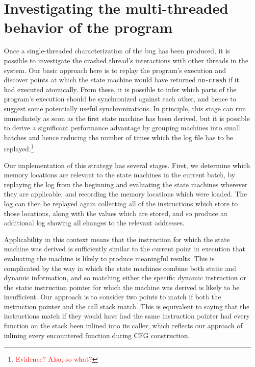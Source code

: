 \documentclass[10pt,twocolumn,preprint,natbib,authoryear]{sigplanconf}
\newcommand{\editorial}[1]{\textcolor{red}{\footnote{\textcolor{red}{#1}}}}
\begin{document}
\section{Investigating the multi-threaded behavior of the program}
\label{sect:multi_threading}

Once a single-threaded characterization of the bug has been produced,
it is possible to investigate the crashed thread's interactions with
other threads in the system.  Our basic approach here is to replay the
program's execution and discover points at which the state machine
would have returned \verb|no-crash| if it had executed atomically.
From these, it is possible to infer which parts of the program's
execution should be synchronized against each other, and hence to
suggest some potentially useful synchronizations.  In principle, this
stage can run immediately as soon as the first state machine has been
derived, but it is possible to derive a significant performance
advantage by grouping machines into small batches and hence reducing
the number of times which the log file has to be
replayed.\editorial{Evidence?  Also, so what?}

Our implementation of this strategy has several stages.  First, we
determine which memory locations are relevant to the state machines in
the current batch, by replaying the log from the beginning and
evaluating the state machines wherever they are applicable, and
recording the memory locations which were loaded.  The log can then be
replayed again collecting all of the instructions which store to those
locations, along with the values which are stored, and so produce an
additional log showing all changes to the relevant addresses.

Applicability in this context means that the instruction for which the
state machine was derived is sufficiently similar to the current point
in execution that evaluating the machine is likely to produce
meaningful results.  This is complicated by the way in which the state
machines combine both static and dynamic information, and so matching
either the specific dynamic instruction or the static instruction
pointer for which the machine was derived is likely to be
insufficient.  Our approach is to consider two points to match if both
the instruction pointer and the call stack match.  This is equivalent
to saying that the instructions match if they would have had the same
instruction pointer had every function on the stack been inlined into
its caller, which reflects our approach of inlining every encountered
function during CFG construction.
\end{document}
